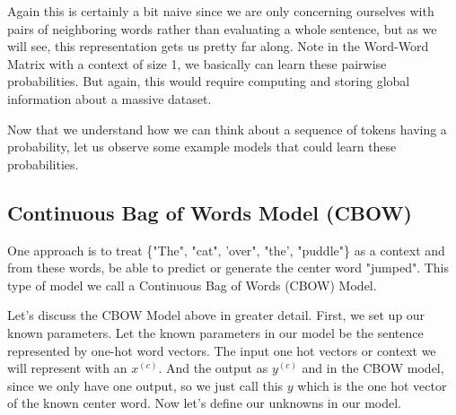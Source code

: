 \documentclass{tufte-handout}
\begin{document}

Again this is certainly a bit naive since we are only concerning ourselves with pairs of neighboring words rather than evaluating a whole sentence, but as we will see, this representation gets us pretty far along. Note in the Word-Word Matrix with a context of size 1, we basically can learn these pairwise probabilities. But again, this would require computing and storing global information about a massive dataset.

Now that we understand how we can think about a sequence of tokens having a probability, let us observe some example models that could learn these probabilities.

\subsection{Continuous Bag of Words Model (CBOW)}

One approach is to treat \{"The", "cat", 'over", "the', "puddle"\} as a context and from these words, be able to predict or generate the center word "jumped". This type of model we call a Continuous Bag of Words (CBOW) Model.


Let's discuss the CBOW Model above in greater detail. First, we set up our known parameters. Let the known parameters in our model be the sentence represented by one-hot word vectors. The input one hot vectors or context we will represent with an $x^{(c)}$. And the output as $y^{(c)}$ and in the CBOW model, since we only have one output, so we just call this $y$ which is the one hot vector of the known center word. Now let's define our unknowns in our model. 

\end{document}
